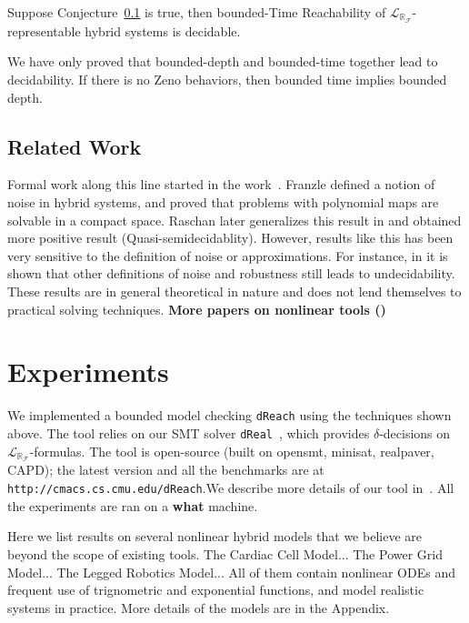 \documentclass[envcountsect]{llncs}
\newcommand{\lrf}{\mathcal{L}_{\mathbb{R}_{\mathcal{F}}}}
\begin{document}
\begin{proposition}
Suppose Conjecture~\ref{} is true, then bounded-Time Reachability of
$\lrf$-representable hybrid systems is decidable.
\end{proposition}
We have only proved that bounded-depth and bounded-time together lead to
decidability. If there is no Zeno behaviors, then bounded time implies bounded
depth.


\subsection{Related Work}
Formal work along this line started in the work~\cite{}.
Franzle defined a notion of noise in hybrid systems, and proved that problems
with polynomial maps are solvable in a compact space. Raschan later generalizes
this result in \cite{} and obtained more positive result
(Quasi-semidecidablity). However, results like this has been very sensitive to
the definition of noise or approximations. For instance, in \cite{} it is shown
that other definitions of noise and robustness still leads to undecidability.
These results are in general theoretical in nature and does not lend themselves
to practical solving techniques. {\bf More papers on nonlinear tools ()}

\section{Experiments}\label{experiments}

We implemented a bounded model checking {\tt dReach} using the
techniques shown above. The tool relies on our SMT solver {\tt dReal}~\cite{},
which provides $\delta$-decisions on $\lrf$-formulas. The tool is open-source
(built on opensmt, minisat, realpaver, CAPD); the latest version and all the
benchmarks are at {\tt http://cmacs.cs.cmu.edu/dReach}.We describe more details
of our tool in~\cite{}. All the experiments are ran on a {\bf what} machine. 

Here we list results on several nonlinear hybrid models that we believe are
beyond the scope of existing tools.
The {\sf Cardiac Cell Model}... The {\sf Power Grid Model}... The {\sf Legged
Robotics Model}... All of them contain nonlinear ODEs and frequent use of
trignometric and exponential functions, and model realistic systems in practice.
More details of the models are in the Appendix. 
\end{document}
